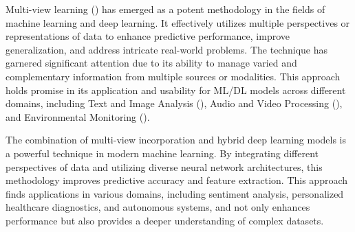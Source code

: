 \documentclass[a4paper, fleqn]{cas-sc}
\theoremstyle{definition}
\theoremstyle{remark}
\begin{document}
Multi-view learning (\cite{zhao2017multi, xu2013survey}) has emerged as a potent methodology in the fields of machine learning and deep learning. It effectively utilizes multiple perspectives or representations of data to enhance predictive performance,  improve generalization,  and address intricate real-world problems. The technique has garnered significant attention due to its ability to manage varied and complementary information from multiple sources or modalities. This approach holds promise in its application and usability for ML/DL models across different domains,  including Text and Image Analysis (\cite{yang2020image, nie2017auto}),  Audio and Video Processing (\cite{garcia2018multi, hussain2021comprehensive}),  and Environmental Monitoring (\cite{huang2017multi}).

The combination of multi-view incorporation and hybrid deep learning models is a powerful technique in modern machine learning. By integrating different perspectives of data and utilizing diverse neural network architectures, this methodology improves predictive accuracy and feature extraction. This approach finds applications in various domains, including sentiment analysis, personalized healthcare diagnostics, and autonomous systems, and not only enhances performance but also provides a deeper understanding of complex datasets.
\end{document}

